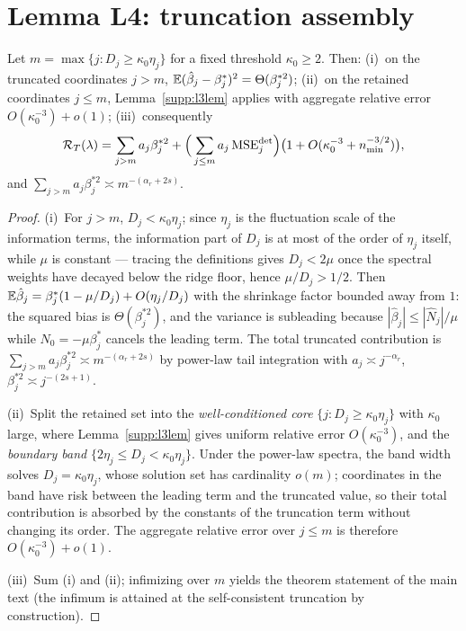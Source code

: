 \section{Lemma L4: truncation assembly}
\label{supp:l4}

\begin{lemma}[L4]\label{supp:l4lem}
Let $m = \max\{j : D_j \ge \kappa_0 \eta_j\}$ for a fixed threshold $\kappa_0 \ge 2$.
Then:
(i)~on the truncated coordinates $j > m$, $\mathbb{E}(\hat\beta_j - \beta^*_j)^2 = \Theta(\beta_j^{*2})$;
(ii)~on the retained coordinates $j \le m$, Lemma~\ref{supp:l3lem} applies with aggregate relative error $O(\kappa_0^{-3}) + o(1)$;
(iii)~consequently
\begin{equation}
  \mathcal{R}_T(\lambda) = \sum_{j > m} a_j \beta_j^{*2} + \Big(\sum_{j \le m} a_j\, \mathrm{MSE}^{\det}_j\Big)\big(1 + O(\kappa_0^{-3} + n_{\min}^{-3/2})\big),
  \label{supp:eq:l4}
\end{equation}
and $\sum_{j>m} a_j\beta_j^{*2} \asymp m^{-(\alpha_r + 2s)}$.
\end{lemma}

\begin{proof}
(i)~For $j > m$, $D_j < \kappa_0\eta_j$; since $\eta_j$ is the fluctuation scale of the information terms, the information part of $D_j$ is at most of the order of $\eta_j$ itself, while $\mu$ is constant --- tracing the definitions gives $D_j < 2\mu$ once the spectral weights have decayed below the ridge floor, hence $\mu/D_j > 1/2$.
Then $\mathbb{E}\hat\beta_j = \beta^*_j(1 - \mu/D_j) + O(\eta_j/D_j)$ with the shrinkage factor bounded away from $1$: the squared bias is $\Theta(\beta_j^{*2})$, and the variance is subleading because $|\hat\beta_j| \le |\hat N_j|/\mu$ while $N_0 = -\mu\beta^*_j$ cancels the leading term.
The total truncated contribution is $\sum_{j>m} a_j\beta_j^{*2} \asymp m^{-(\alpha_r+2s)}$ by power-law tail integration with $a_j \asymp j^{-\alpha_r}$, $\beta_j^{*2} \asymp j^{-(2s+1)}$.

(ii)~Split the retained set into the \emph{well-conditioned core} $\{j : D_j \ge \kappa_0 \eta_j\}$ with $\kappa_0$ large, where Lemma~\ref{supp:l3lem} gives uniform relative error $O(\kappa_0^{-3})$, and the \emph{boundary band} $\{2\eta_j \le D_j < \kappa_0\eta_j\}$.
Under the power-law spectra, the band width solves $D_j = \kappa_0\eta_j$, whose solution set has cardinality $o(m)$; coordinates in the band have risk between the leading term and the truncated value, so their total contribution is absorbed by the constants of the truncation term without changing its order.
The aggregate relative error over $j \le m$ is therefore $O(\kappa_0^{-3}) + o(1)$.

(iii)~Sum (i) and (ii); infimizing over $m$ yields the theorem statement of the main text (the infimum is attained at the self-consistent truncation by construction).
\end{proof}

